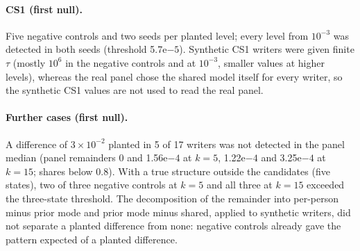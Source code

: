 \documentclass[10pt]{article}
\newcommand{\e}[2]{#1e$#2$}
\begin{document}
\paragraph{CS1 (first null).} Five negative controls and two seeds per planted level; every level from $10^{-3}$ was detected in both seeds (threshold \e{5.7}{-5}). Synthetic CS1 writers were given finite $\tau$ (mostly $10^6$ in the negative controls and at $10^{-3}$, smaller values at higher levels), whereas the real panel chose the shared model itself for every writer, so the synthetic CS1 values are not used to read the real panel.

\paragraph{Further cases (first null).} A difference of $3\times10^{-2}$ planted in 5 of 17 writers was not detected in the panel median (panel remainders 0 and \e{1.56}{-4} at $k=5$, \e{1.22}{-4} and \e{3.25}{-4} at $k=15$; shares below 0.8). With a true structure outside the candidates (five states), two of three negative controls at $k=5$ and all three at $k=15$ exceeded the three-state threshold. The decomposition of the remainder into per-person minus prior mode and prior mode minus shared, applied to synthetic writers, did not separate a planted difference from none: negative controls already gave the pattern expected of a planted difference.
\end{document}
